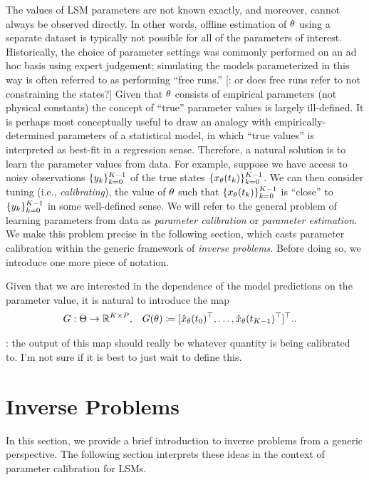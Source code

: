 \documentclass[12pt]{article}
\begin{document}
The values of LSM parameters are not known exactly, and moreover, cannot always be observed directly. In other words, offline estimation of $\Par$
using a separate dataset is typically not possible for all of the parameters of interest. Historically, the choice of parameter settings 
was commonly performed on an ad hoc basis using expert judgement; simulating the models parameterized in this way is often 
referred to as performing ``free runs.'' [\todo: or does free runs refer to not constraining the states?]
Given that $\Par$ consists of empirical parameters 
(not physical constants) the concept of ``true'' parameter values is largely ill-defined. It is perhaps most conceptually useful to draw an 
analogy with empirically-determined parameters of a statistical model, in which ``true values'' is interpreted as best-fit in a regression sense.
Therefore, a natural solution is to learn the parameter values from data. For example, suppose we have access to noisy observations 
$\{\indexTime{\obs}\}_{\timeIdx=0}^{\Ntime-1}$ of the true states $\{\state_{\Par}(\indexTime{\Time})\}_{\timeIdx=0}^{\Ntime-1}$. 
We can then consider tuning (i.e., \textit{calibrating}), the value of $\Par$ such that $\{\state_{\Par}(\indexTime{\Time})\}_{\timeIdx=0}^{\Ntime-1}$
is ``close'' to $\{\indexTime{\obs}\}_{\timeIdx=0}^{\Ntime-1}$  in some well-defined sense. We will refer to the 
general problem of learning parameters from data as \textit{parameter calibration} or \textit{parameter estimation}. We make this 
problem precise in the following section, which casts parameter calibration within the generic framework of \textit{inverse problems}. 
Before doing so, we introduce one more piece of notation. 

Given that we are interested in the dependence of the model predictions 
on the parameter value, it is natural to introduce the map 
\begin{align}
&\fwd: \parSpace \to \R^{\Ntime \times \dimState}, && \fwd(\Par) 
\Def [\stateApprox_{\Par}(\indexTime[0]{\Time})^\top, \dots, \stateApprox_{\Par}(\indexTime[\Ntime-1]{\Time})^\top]^\top. \label{fwd_model}.
\end{align}

\todo: the output of this map should really be whatever quantity is being calibrated to. I'm not sure if it is best to just wait to define this. 


\section{Inverse Problems}
In this section, we provide a brief introduction to inverse problems from a generic perspective. The following section 
interprets these ideas in the context of parameter calibration for LSMs. 
\end{document}
